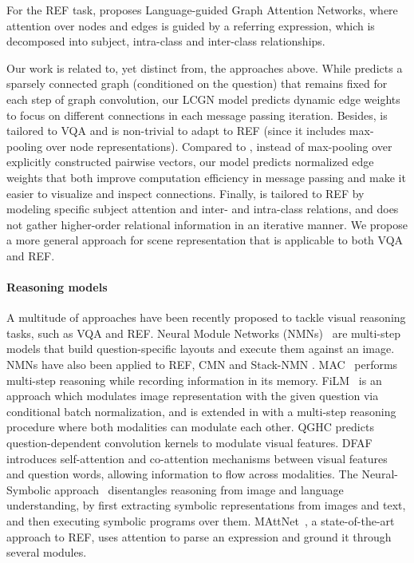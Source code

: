 \documentclass[10pt,twocolumn,letterpaper]{article}
\begin{document}
For the REF task, \cite{wang2019neighbourhood} proposes Language-guided Graph Attention Networks, where attention over nodes and edges is guided by a referring expression, which is decomposed into subject, intra-class and inter-class relationships.

Our work is related to, yet distinct from, the approaches above. 
While \cite{norcliffe2018learning} predicts a sparsely connected graph (conditioned on the question) that remains fixed for each step of graph convolution, our LCGN model predicts dynamic edge weights to focus on different connections in each message passing iteration. Besides,  \cite{norcliffe2018learning} is tailored to VQA and is non-trivial to adapt to REF (since it includes max-pooling over node representations). 
Compared to \cite{cadene2019murel}, instead of max-pooling over explicitly constructed pairwise vectors, our model predicts normalized edge weights that both improve computation efficiency in message passing and make it easier to visualize and inspect connections.
Finally, \cite{wang2019neighbourhood} is tailored to REF by modeling specific subject attention and inter- and intra-class relations, and does not gather higher-order relational information in an iterative manner. We propose a more general approach for scene representation that is applicable to both VQA and REF.

\vspace{-1em}
\paragraph{Reasoning models} 

A multitude of approaches have been recently proposed to tackle visual reasoning tasks, such as VQA and REF. Neural Module Networks (NMNs)~\cite{andreas16neural,hu2017learning} are multi-step models that build question-specific layouts and execute them against an image. NMNs have also been applied to REF, \eg CMN \cite{hu2017modeling} and Stack-NMN \cite{hu2018explainable}. MAC~\cite{hudson2018compositional} performs multi-step reasoning while recording information in its memory. 
FiLM~\cite{perez2018film} is an approach which modulates image representation with the given question via conditional batch normalization, and is extended in \cite{yao2018cascaded} with a multi-step reasoning procedure where both modalities can modulate each other. QGHC \cite{gao2018question} predicts question-dependent convolution kernels to modulate visual features. DFAF \cite{gao2019dynamic} introduces self-attention and co-attention mechanisms between visual features and question words, allowing information to flow across modalities. The Neural-Symbolic approach~\cite{yi2018neural} disentangles reasoning from image and language understanding, by first extracting symbolic representations from images and text, and then executing symbolic programs over them. 
MAttNet~\cite{yu2018mattnet}, a state-of-the-art approach to REF, uses attention to parse an expression and ground it through several modules. 
\end{document}
